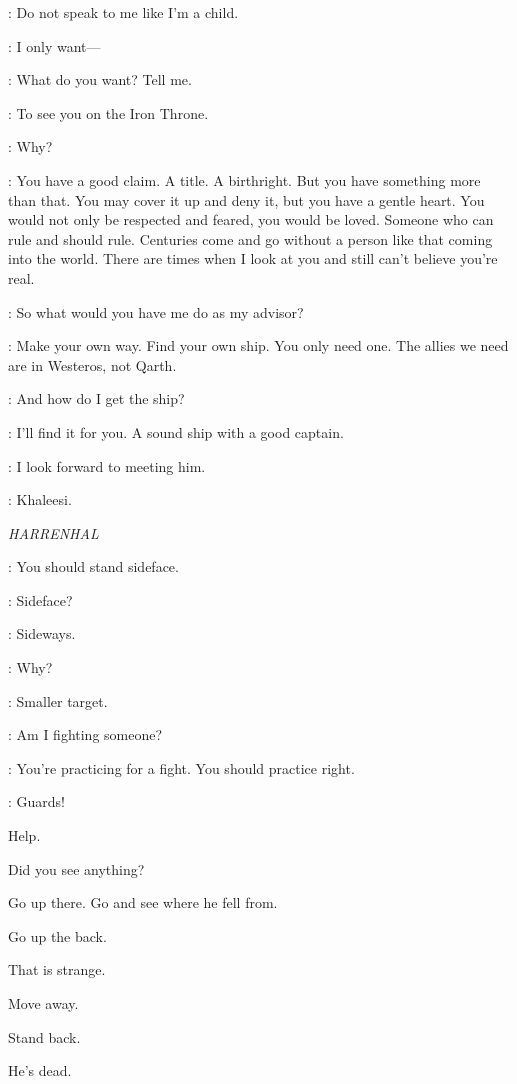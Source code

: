 \DAENERYS: Do not speak to me like I'm a child. 

\JORAH: I only want--- 

\DAENERYS: What do you want? Tell me. 

\JORAH: To see you on the Iron Throne. 

\DAENERYS: Why? 

\JORAH: You have a good claim. A title. A birthright. But you have something more than that. You may cover it up and deny it, but you have a gentle heart. You would not only be respected and feared, you would be loved. Someone who can rule and should rule. Centuries come and go without a person like that coming into the world. There are times when I look at you and still can't believe you're real. 

\DAENERYS: So what would you have me do as my advisor? 

\JORAH: Make your own way. Find your own ship. You only need one. The allies we need are in Westeros, not Qarth. 

\DAENERYS: And how do I get the ship? 

\JORAH: I'll find it for you. A sound ship with a good captain. 

\DAENERYS: I look forward to meeting him. 

\enlargethispage*{20pt}
\JORAH: Khaleesi. 



\scene

\textit{HARRENHAL} 


\ARYA: You should stand sideface. 

\GENDRY: Sideface? 

\ARYA: Sideways. 

\GENDRY: Why? 

\ARYA: Smaller target. 

\GENDRY: Am I fighting someone? 

\ARYA: You're practicing for a fight. You should practice right. 


\VOICES: Guards! 

Help. 

Did you see anything? 

Go up there. Go and see where he fell from. 

Go up the back. 

That is strange. 

Move away. 

Stand back. 

He's dead. 


